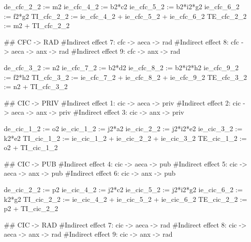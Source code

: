\documentclass[
  letterpaper,
  DIV=11,
  numbers=noendperiod]{scrreprt}
\newenvironment{Shaded}{\begin{snugshade}}{\end{snugshade}}
\newcommand{\StringTok}[1]{\textcolor[rgb]{0.13,0.47,0.30}{#1}}
\begin{document}
\begin{Shaded}
\begin{Highlighting}[]
\StringTok{de\_cfc\_2\_2 := m2}
\StringTok{ie\_cfc\_4\_2 := b2*c2}
\StringTok{ie\_cfc\_5\_2 := b2*i2*g2}
\StringTok{ie\_cfc\_6\_2 := f2*g2}
\StringTok{TI\_cfc\_2\_2 := ie\_cfc\_4\_2 + ie\_cfc\_5\_2 + ie\_cfc\_6\_2}
\StringTok{TE\_cfc\_2\_2 := m2 + TI\_cfc\_2\_2}


\StringTok{\#\# CFC {-}\textgreater{} RAD}
\StringTok{\#Indirect effect 7: cfc {-}\textgreater{} aeca {-}\textgreater{} rad}
\StringTok{\#Indirect effect 8: cfc {-}\textgreater{} aeca {-}\textgreater{} anx {-}\textgreater{} rad}
\StringTok{\#Indirect effect 9: cfc {-}\textgreater{} anx {-}\textgreater{} rad}

\StringTok{de\_cfc\_3\_2 := n2}
\StringTok{ie\_cfc\_7\_2 := b2*d2}
\StringTok{ie\_cfc\_8\_2 := b2*i2*h2}
\StringTok{ie\_cfc\_9\_2 := f2*h2}
\StringTok{TI\_cfc\_3\_2 := ie\_cfc\_7\_2 + ie\_cfc\_8\_2 + ie\_cfc\_9\_2}
\StringTok{TE\_cfc\_3\_2 := n2 + TI\_cfc\_3\_2}



\StringTok{\#\# CIC {-}\textgreater{} PRIV}
\StringTok{\#Indirect effect 1: cic {-}\textgreater{} aeca {-}\textgreater{} priv}
\StringTok{\#Indirect effect 2: cic {-}\textgreater{} aeca {-}\textgreater{} anx {-}\textgreater{} priv}
\StringTok{\#Indirect effect 3: cic {-}\textgreater{} anx {-}\textgreater{} priv}

\StringTok{de\_cic\_1\_2 := o2}
\StringTok{ie\_cic\_1\_2 := j2*a2}
\StringTok{ie\_cic\_2\_2 := j2*i2*e2}
\StringTok{ie\_cic\_3\_2 := k2*e2}
\StringTok{TI\_cic\_1\_2 := ie\_cic\_1\_2 + ie\_cic\_2\_2 + ie\_cic\_3\_2}
\StringTok{TE\_cic\_1\_2 := o2 + TI\_cic\_1\_2}


\StringTok{\#\# CIC {-}\textgreater{} PUB}
\StringTok{\#Indirect effect 4: cic {-}\textgreater{} aeca {-}\textgreater{} pub}
\StringTok{\#Indirect effect 5: cic {-}\textgreater{} aeca {-}\textgreater{} anx {-}\textgreater{} pub}
\StringTok{\#Indirect effect 6: cic {-}\textgreater{} anx {-}\textgreater{} pub}

\StringTok{de\_cic\_2\_2 := p2}
\StringTok{ie\_cic\_4\_2 := j2*c2}
\StringTok{ie\_cic\_5\_2 := j2*i2*g2}
\StringTok{ie\_cic\_6\_2 := k2*g2}
\StringTok{TI\_cic\_2\_2 := ie\_cic\_4\_2 + ie\_cic\_5\_2 + ie\_cic\_6\_2}
\StringTok{TE\_cic\_2\_2 := p2 + TI\_cic\_2\_2}


\StringTok{\#\# CIC {-}\textgreater{} RAD}
\StringTok{\#Indirect effect 7: cic {-}\textgreater{} aeca {-}\textgreater{} rad}
\StringTok{\#Indirect effect 8: cic {-}\textgreater{} aeca {-}\textgreater{} anx {-}\textgreater{} rad}
\StringTok{\#Indirect effect 9: cic {-}\textgreater{} anx {-}\textgreater{} rad}


\end{Highlighting}
\end{Shaded}
\end{document}

